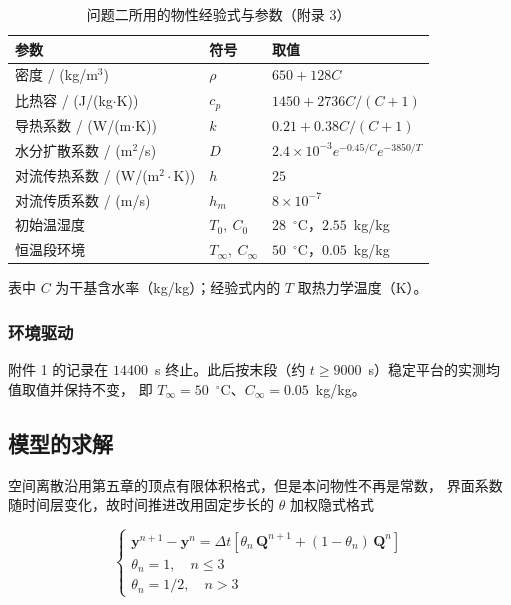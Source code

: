 \begin{table}[H]
  \centering
  \caption{问题二所用的物性经验式与参数（附录 3）}
  \label{tab:q2props}
  \small
  \begin{tabular}{@{}lll@{}}
    \toprule
    参数 & 符号 & 取值 \\
    \midrule
    密度 / (kg/m$^3$) & $\rho$ & $650+128C$ \\
    比热容 / (J/(kg$\cdot$K)) & $c_p$ & $1450+2736C/(C+1)$ \\
    导热系数 / (W/(m$\cdot$K)) & $k$ & $0.21+0.38C/(C+1)$ \\
    水分扩散系数 / (m$^2$/s) & $D$ & $2.4\times10^{-3}e^{-0.45/C}e^{-3850/T}$ \\
    对流传热系数 / (W/(m$^2\cdot$K)) & $h$ & $25$ \\
    对流传质系数 / (m/s) & $h_m$ & $8\times10^{-7}$ \\
    初始温湿度 & $T_0,\ C_0$ & $28$~$^\circ$C，$2.55$~kg/kg \\
    恒温段环境 & $T_\infty,\ C_\infty$ & $50$~$^\circ$C，$0.05$~kg/kg \\
    \bottomrule
  \end{tabular}
  \par\smallskip\footnotesize 表中 $C$ 为干基含水率（kg/kg）；经验式内的 $T$ 取热力学温度（K）。
\end{table}

\subsubsection{环境驱动}

附件 1 的记录在 $14400$~s 终止。此后按末段（约 $t\ge9000$~s）稳定平台的实测均值取值并保持不变，
即 $T_\infty=50$~$^\circ$C、$C_\infty=0.05$~kg/kg。

\subsection{模型的求解}


空间离散沿用第五章的顶点有限体积格式，但是本问物性不再是常数，
界面系数随时间层变化，故时间推进改用固定步长的 $\theta$ 加权隐式格式

\[
\begin{cases}
\mathbf{y}^{n+1}-\mathbf{y}^{n}
=\Delta t\left[\theta_n\,\mathbf{Q}^{n+1}+(1-\theta_n)\,\mathbf{Q}^{n}\right]\\[16pt]
\theta_n=1,\quad n\le 3\\[16pt]
\theta_n=1/2,\quad n>3
\end{cases}
\]


